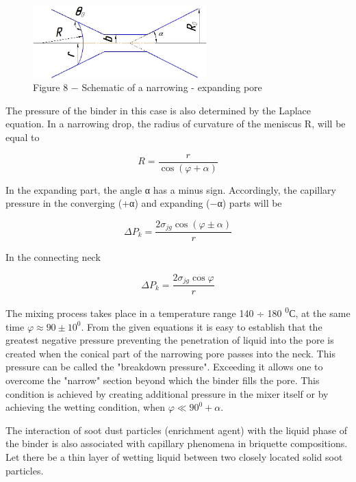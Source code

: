 \begin{figure}[H]
	\centering
	\includegraphics[width=0.6\textwidth]{media/gorn2/image11}
	\caption*{Figure 8 − Schematic of a narrowing - expanding pore}
\end{figure}

\begin{multicols}{2}
The pressure of the binder in this case is also determined by the
Laplace equation. In a narrowing drop, the radius of curvature of the
meniscus R, will be equal to

\begin{equation*}
    R = \frac{r}{\cos(\varphi + \alpha)}
\end{equation*}

In the expanding part, the angle α has a minus sign. Accordingly, the
capillary pressure in the converging (+α) and expanding (−α) parts will
be

\begin{equation*}
    \Delta P_k = \frac{2\sigma_{jg} \cos(\varphi \pm \alpha)}{r}
\end{equation*}

In the connecting neck

\begin{equation*}
    \Delta P_k = \frac{2\sigma_{jg} \cos\varphi}{r}
\end{equation*}

The mixing process takes place in a temperature range 140 ÷ 180
\textsuperscript{0}С, at the same time
\(\varphi \approx 90 \pm 10^{0}\). From the given equations it is easy
to establish that the greatest negative pressure preventing the
penetration of liquid into the pore is created when the conical part of
the narrowing pore passes into the neck. This pressure can be called the
"breakdown pressure". Exceeding it allows one to overcome the "narrow"
section beyond which the binder fills the pore. This condition is
achieved by creating additional pressure in the mixer itself or by
achieving the wetting condition, when \(\varphi \ll 90^{0} + \alpha.\)

The interaction of soot dust particles (enrichment agent) with the
liquid phase of the binder is also associated with capillary phenomena
in briquette compositions. Let there be a thin layer of wetting liquid
between two closely located solid soot particles.
\end{multicols}

